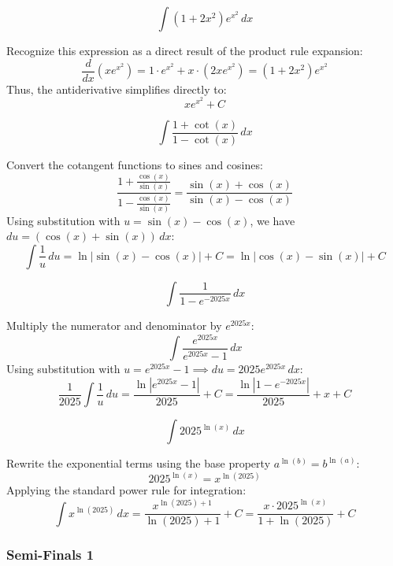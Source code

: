 \begin{questions}
\question
\[ \int (1+2x^{2})e^{x^{2}} \, dx \]
\begin{solution}
Recognize this expression as a direct result of the product rule expansion:
\[ \frac{d}{dx}\left(xe^{x^2}\right) = 1 \cdot e^{x^2} + x \cdot (2xe^{x^2}) = (1+2x^2)e^{x^2} \]
Thus, the antiderivative simplifies directly to:
\[ xe^{x^{2}} + C \]
\end{solution}

\question
\[ \int \frac{1+\cot(x)}{1-\cot(x)} \, dx \]
\begin{solution}
Convert the cotangent functions to sines and cosines:
\[ \frac{1+\frac{\cos(x)}{\sin(x)}}{1-\frac{\cos(x)}{\sin(x)}} = \frac{\sin(x)+\cos(x)}{\sin(x)-\cos(x)} \]
Using substitution with $u = \sin(x)-\cos(x)$, we have $du = (\cos(x)+\sin(x)) \, dx$:
\[ \int \frac{1}{u} \, du = \ln|\sin(x)-\cos(x)| + C = \ln|\cos(x)-\sin(x)| + C \]
\end{solution}

\question
\[ \int \frac{1}{1-e^{-2025x}} \, dx \]
\begin{solution}
Multiply the numerator and denominator by $e^{2025x}$:
\[ \int \frac{e^{2025x}}{e^{2025x}-1} \, dx \]
Using substitution with $u = e^{2025x}-1 \implies du = 2025e^{2025x} \, dx$:
\[ \frac{1}{2025}\int \frac{1}{u} \, du = \frac{\ln|e^{2025x}-1|}{2025} + C = \frac{\ln|1-e^{-2025x}|}{2025} + x + C \]
\end{solution}

\question
\[ \int 2025^{\ln(x)} \, dx \]
\begin{solution}
Rewrite the exponential terms using the base property $a^{\ln(b)} = b^{\ln(a)}$:
\[ 2025^{\ln(x)} = x^{\ln(2025)} \]
Applying the standard power rule for integration:
\[ \int x^{\ln(2025)} \, dx = \frac{x^{\ln(2025)+1}}{\ln(2025)+1} + C = \frac{x \cdot 2025^{\ln(x)}}{1+\ln(2025)} + C \]
\end{solution}

\end{questions}

\newpage
\subsubsection*{Semi-Finals 1}

